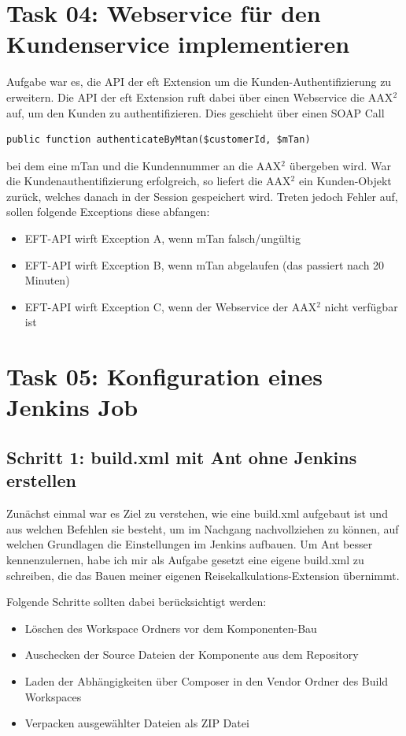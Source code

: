 \documentclass[11pt,a4paper]{article}
\begin{document}
\section{Task 04: Webservice für den Kundenservice implementieren}

Aufgabe war es, die API der eft Extension um die Kunden-Authentifizierung zu erweitern.
Die API der eft Extension ruft dabei über einen Webservice die AAX$^2$ auf, um den Kunden zu authentifizieren.
Dies geschieht über einen SOAP Call 
\begin{lstlisting}
public function authenticateByMtan($customerId, $mTan)
\end{lstlisting}
bei dem eine mTan und die Kundennummer an die AAX$^2$ übergeben wird.
War die Kundenauthentifizierung erfolgreich, so liefert die AAX$^2$ ein Kunden-Objekt zurück, welches
danach in der Session gespeichert wird.
Treten jedoch Fehler auf, sollen folgende Exceptions diese abfangen:

\begin{itemize}
	\item EFT-API wirft Exception A, wenn mTan falsch/ungültig
	\item EFT-API wirft Exception B, wenn mTan abgelaufen (das passiert nach 20 Minuten)
	\item EFT-API wirft Exception C, wenn der Webservice der AAX$^2$ nicht verfügbar ist
\end{itemize}



\section{Task 05: Konfiguration eines Jenkins Job}

\subsection{Schritt 1: build.xml mit Ant ohne Jenkins erstellen}
Zunächst einmal war es Ziel zu verstehen, wie eine build.xml aufgebaut ist
und aus welchen Befehlen sie besteht, um im Nachgang nachvollziehen zu können, auf welchen
Grundlagen die Einstellungen im Jenkins aufbauen.
Um Ant besser kennenzulernen, habe ich mir als Aufgabe gesetzt eine eigene build.xml
zu schreiben, die das Bauen meiner eigenen Reisekalkulations-Extension übernimmt.

Folgende Schritte sollten dabei berücksichtigt werden:

\begin{itemize}
	\item Löschen des Workspace Ordners vor dem Komponenten-Bau
	\item Auschecken der Source Dateien der Komponente aus dem Repository
	\item Laden der Abhängigkeiten über Composer in den Vendor Ordner des Build Workspaces
	\item Verpacken ausgewählter Dateien als ZIP Datei
\end{itemize}
\end{document}
